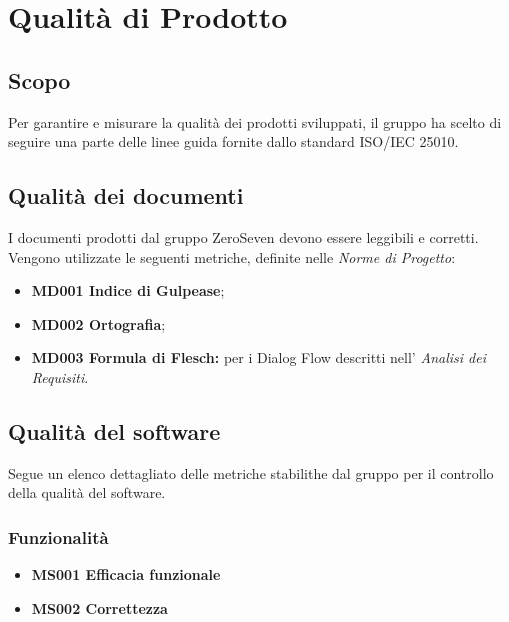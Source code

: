 \chapter{Qualità di Prodotto}
\section{Scopo}
Per garantire e misurare la qualità dei prodotti sviluppati, il gruppo ha scelto di seguire una parte delle linee guida fornite dallo standard ISO/IEC 25010.
\section{Qualità dei documenti}
I documenti prodotti dal gruppo ZeroSeven devono essere leggibili e corretti. Vengono utilizzate le seguenti metriche, definite nelle \textit{Norme di Progetto}:
\begin{itemize}
    \item \textbf{MD001 Indice di Gulpease};
    \item \textbf{MD002 Ortografia};
    \item \textbf{MD003 Formula di Flesch:} per i Dialog Flow descritti nell' \textit{Analisi dei Requisiti}.
\end{itemize}
\section{Qualità del software}
Segue un elenco dettagliato delle metriche stabilithe dal gruppo per il controllo della qualità del software.

\subsection{Funzionalità}
\begin{itemize}
	\item \textbf{MS001 Efficacia funzionale}
	\item \textbf{MS002 Correttezza}
\end{itemize}
